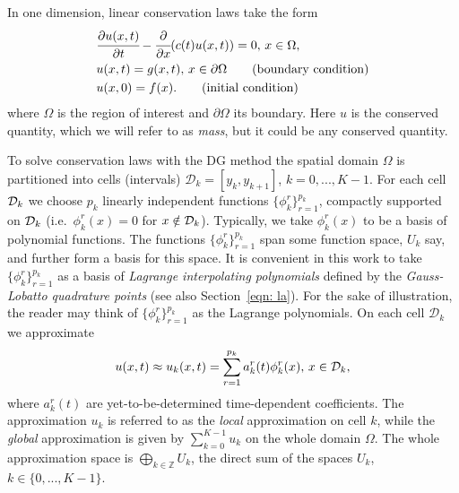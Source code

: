 In one dimension, linear conservation laws take the form 
\begin{align}
	&\cfrac{\partial u( x, t)}{\partial t} - \cfrac{\partial}{\partial x} ( c(t) u( x, t)) = 0,\,  x \in \Omega, \label{eqn: cons law}
	\\& u( x,t)= g( x,t),\, x \in \partial \Omega\tag{boundary condition}
	\\& u( x,0)=f( x).\tag{initial condition}
\end{align}
where \(\Omega\) is the region of interest and \(\partial \Omega\) its boundary. Here \(u\) is the conserved quantity, which we will refer to as \emph{mass}, but it could be any conserved quantity. 

To solve conservation laws with the DG method the spatial domain \(\Omega\) is partitioned into cells (intervals) \(\mathcal D_k = [y_k,y_{k+1}]\), \(k=0,...,K-1\). For each cell \(\mathcal{D}_k\) we choose \(p_k\) linearly independent functions \(\{\phi^r_k\}_{r=1}^{p_k}\), compactly supported on \(\mathcal{D}_{k}\) (i.e.~\(\phi^r_k(x)=0\) for \(x\notin\mathcal{D}_{k}\)). Typically, we take \(\phi_k^r(x)\) to be a basis of polynomial functions. The functions \(\{\phi^r_k\}_{r=1}^{p_k}\) span some function space, \(U_k\) say, and further form a basis for this space. It is convenient in this work to take \(\{\phi^r_k\}_{r=1}^{p_k}\) as a basis of \emph{Lagrange interpolating polynomials} defined by the \emph{Gauss-Lobatto quadrature points} \citep{nodalDGBook} (see also Section~\ref{eqn: la}). For the sake of illustration, the reader may think of \(\{\phi^r_k\}_{r=1}^{p_k}\) as the Lagrange polynomials. On each cell \(\mathcal D_{k}\) we approximate 
\[u(x,t)\approx u_{k}(x,t)=\sum\limits_{r=1}^{p_k}a_{k}^r(t)\phi^r_k(x),\, x \in\mathcal{D}_k,\] 
where \(a_{k}^r(t)\) are yet-to-be-determined time-dependent coefficients. The approximation \(u_{k}\) is referred to as the \textit{local} approximation on cell \(k\), while the \textit{global} approximation is given by \(\sum\limits_{k=0}^{K-1} u_{k}\) on the whole domain \(\Omega\). The whole approximation space is \(\bigoplus\limits_{k\in\mathbb Z} U_k\), the direct sum of the spaces \(U_k\), \(k\in\{0,...,K-1\}\).

